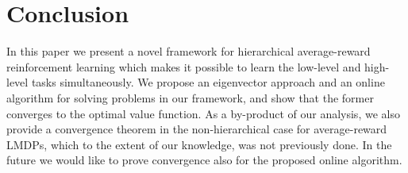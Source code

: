 



\section{Conclusion}

In this paper we present a novel framework for hierarchical average-reward reinforcement learning which makes it possible to learn the low-level and high-level tasks simultaneously. 
We propose an eigenvector approach and an online algorithm for solving problems in our framework, and show that the former converges to the optimal value function. As a by-product of our analysis, we also provide a convergence theorem in the non-hierarchical case for average-reward LMDPs, which to the extent of our knowledge, was not previously done. In the future we would like to prove convergence also for the proposed online algorithm.
